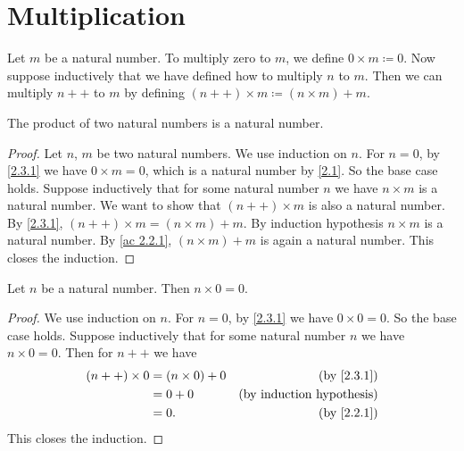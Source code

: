 \section{Multiplication}\label{sec 2.3}

\begin{definition}\label{2.3.1}
  Let \(m\) be a natural number.
  To multiply zero to \(m\), we define \(0 \times m \coloneqq 0\).
  Now suppose inductively that we have defined how to multiply \(n\) to \(m\).
  Then we can multiply \(n++\) to \(m\) by defining \((n++) \times m \coloneqq (n \times m) + m\).
\end{definition}

\begin{additional corollary}\label{ac 2.3.1}
The product of two natural numbers is a natural number.
\end{additional corollary}

\begin{proof}
  Let \(n\), \(m\) be two natural numbers.
  We use induction on \(n\).
  For \(n = 0\), by \cref{2.3.1} we have \(0 \times m = 0\), which is a natural number by \cref{2.1}.
  So the base case holds.
  Suppose inductively that for some natural number \(n\) we have \(n \times m\) is a natural number.
  We want to show that \((n++) \times m\) is also a natural number.
  By \cref{2.3.1}, \((n++) \times m = (n \times m) + m\).
  By induction hypothesis \(n \times m\) is a natural number.
  By \cref{ac 2.2.1}, \((n \times m) + m\) is again a natural number.
  This closes the induction.
\end{proof}

\begin{additional corollary}\label{ac 2.3.2}
Let \(n\) be a natural number.
Then \(n \times 0 = 0\).
\end{additional corollary}

\begin{proof}
  We use induction on \(n\).
  For \(n = 0\), by \cref{2.3.1} we have \(0 \times 0 = 0\).
  So the base case holds.
  Suppose inductively that for some natural number \(n\) we have \(n \times 0 = 0\).
  Then for \(n++\) we have
  \begin{align*}
    (n++) \times 0 & = (n \times 0) + 0 & \text{(by \cref{2.3.1})}         \\
                   & = 0 + 0            & \text{(by induction hypothesis)} \\
                   & = 0.               & \text{(by \cref{2.2.1})}
  \end{align*}
  This closes the induction.
\end{proof}

